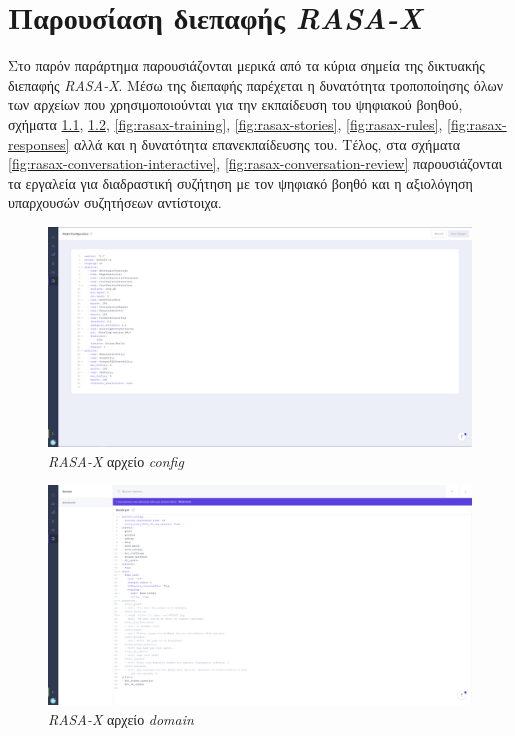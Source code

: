 \appendix

\chapter{Παρουσίαση διεπαφής \emph{RASA-X}}
\label{chapter:appendix}
Στο παρόν παράρτημα παρουσιάζονται μερικά από τα κύρια σημεία της δικτυακής διεπαφής \emph{RASA-X}. Μέσω της διεπαφής παρέχεται η δυνατότητα τροποποίησης όλων των αρχείων που χρησιμοποιούνται για την εκπαίδευση του ψηφιακού βοηθού, σχήματα \ref{fig:rasax-config}, \ref{fig:rasax-domain}, \ref{fig:rasax-training}, \ref{fig:rasax-stories}, \ref{fig:rasax-rules}, \ref{fig:rasax-responses} αλλά και η δυνατότητα επανεκπαίδευσης του. Τέλος, στα σχήματα \ref{fig:rasax-conversation-interactive}, \ref{fig:rasax-conversation-review} παρουσιάζονται τα εργαλεία για διαδραστική συζήτηση με τον ψηφιακό βοηθό και η αξιολόγηση υπαρχουσών συζητήσεων αντίστοιχα.

\begin{figure}[!ht]
  \centering
  \captionsetup{justification=centering}
  \includegraphics[width=1\textwidth]{images/appendix/rasax-config.png}
  \caption{\emph{RASA-X} αρχείο \emph{config}}
  \label{fig:rasax-config}
\end{figure}
\noindent

\begin{figure}[!ht]
  \centering
  \captionsetup{justification=centering}
  \includegraphics[width=1\textwidth]{images/appendix/rasax-domain.png}
  \caption{\emph{RASA-X} αρχείο \emph{domain}}
  \label{fig:rasax-domain}
\end{figure}
\noindent

